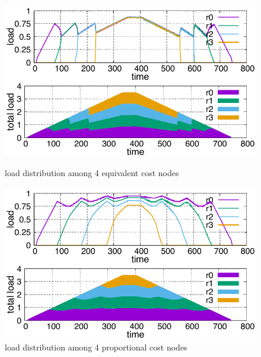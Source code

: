 \begin{figure}[tb]
  \begin{minipage}{1.0\columnwidth}
  \begin{center}
    \includegraphics[width=1.0\columnwidth]{4node.pdf}
    \vspace{-2.0ex}
    \caption{load distribution among 4 equivalent cost nodes}
    \label{fig:4node}
  \end{center}
  \end{minipage}
  \hspace{0.8\columnsep}
  \begin{minipage}{1.0\columnwidth}
  \begin{center}
    \includegraphics[width=1.0\columnwidth]{4node-ratio.pdf}
    \vspace{-2.0ex}
    \caption{load distribution among 4 proportional cost nodes}
    \label{fig:4node-ratio}
  \end{center}
  \end{minipage}
\end{figure}

